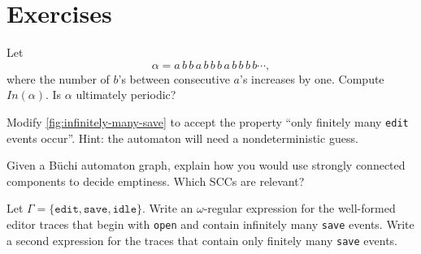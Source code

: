 \section*{Exercises}

\begin{chapex}
Let
\[
  \alpha = a\,b\,b\,a\,b\,b\,b\,a\,b\,b\,b\,b\cdots,
\]
where the number of $b$'s between consecutive $a$'s increases by one.
Compute $In(\alpha)$.  Is $\alpha$ ultimately periodic?
\end{chapex}

\begin{chapex}
Modify \cref{fig:infinitely-many-save} to accept the property
``only finitely many \texttt{edit} events occur''.  Hint: the automaton
will need a nondeterministic guess.
\end{chapex}

\begin{chapex}
Given a B\"uchi automaton graph, explain how you would use strongly
connected components to decide emptiness.  Which SCCs are relevant?
\end{chapex}

\begin{chapex}
Let $\Gamma=\{\texttt{edit},\texttt{save},\texttt{idle}\}$.  Write an
$\omega$-regular expression for the well-formed editor traces that begin
with \texttt{open} and contain infinitely many \texttt{save} events.
Write a second expression for the traces that contain only finitely many
\texttt{save} events.
\end{chapex}
